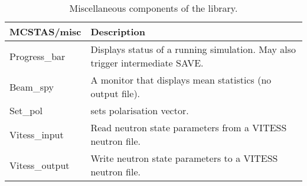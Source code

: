 \begin{table}
  \begin{center}
    {\let\my=\\
    \begin{tabular}{|p{}|p{}|}
      \hline
       \textbf{MCSTAS/misc} & Description \\
       \hline
 Progress\_bar     &  Displays status of a running simulation.
                      May also trigger intermediate SAVE.\\
 Beam\_spy         & A monitor that displays mean statistics (no output file). \\
 Set\_pol          & sets polarisation vector. \\
 Vitess\_input     &   Read neutron state parameters from a VITESS neutron file.\\
 Vitess\_output    &  Write neutron state parameters to a VITESS neutron file.\\
      \hline
    \end{tabular}
    \caption{Miscellaneous components of the \MCS library.}
    \label{t:comp-misc}
    }
  \end{center}
\end{table}

